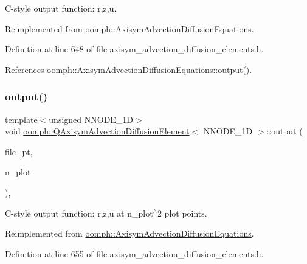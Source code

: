 C-\/style output function\+: r,z,u. 



Reimplemented from \hyperlink{classoomph_1_1AxisymAdvectionDiffusionEquations_a79345d7ee2f42aa679538839b5128a58}{oomph\+::\+Axisym\+Advection\+Diffusion\+Equations}.



Definition at line 648 of file axisym\+\_\+advection\+\_\+diffusion\+\_\+elements.\+h.



References oomph\+::\+Axisym\+Advection\+Diffusion\+Equations\+::output().

\mbox{\label{classoomph_1_1QAxisymAdvectionDiffusionElement_a636e99ae2ec6ac0c5e691acb89c3f5ef}} 
\subsubsection{\texorpdfstring{output()}{output()}\hspace{0.1cm}{\footnotesize\ttfamily [4/4]}}
{\footnotesize\ttfamily template$<$unsigned N\+N\+O\+D\+E\+\_\+1D$>$ \\
void \hyperlink{classoomph_1_1QAxisymAdvectionDiffusionElement}{oomph\+::\+Q\+Axisym\+Advection\+Diffusion\+Element}$<$ N\+N\+O\+D\+E\+\_\+1D $>$\+::output (\begin{DoxyParamCaption}\item[{F\+I\+LE $\ast$}]{file\+\_\+pt,  }\item[{const unsigned \&}]{n\+\_\+plot }\end{DoxyParamCaption})\hspace{0.3cm}{\ttfamily [inline]}, {\ttfamily [virtual]}}



C-\/style output function\+: r,z,u at n\+\_\+plot$^\wedge$2 plot points. 



Reimplemented from \hyperlink{classoomph_1_1AxisymAdvectionDiffusionEquations_ae8f5071aa83c8b71e3d455ae56a25214}{oomph\+::\+Axisym\+Advection\+Diffusion\+Equations}.



Definition at line 655 of file axisym\+\_\+advection\+\_\+diffusion\+\_\+elements.\+h.



